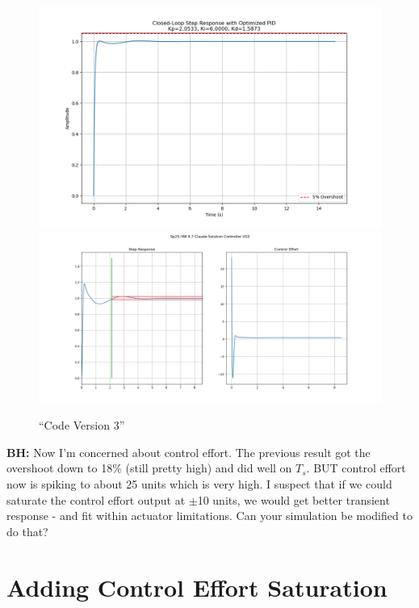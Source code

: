 \documentclass{article}
\begin{document}
\begin{figure}\centering
\includegraphics[height=0.35\textwidth]{figsapdx/M47G18cl.png}
\includegraphics[height=0.35\textwidth]{figsapdx/M47G18.png}
\caption{``Code Version 3''}
\end{figure}

\textbf{BH:}
Now I'm concerned about control effort. The previous result got the overshoot down to 18\% (still pretty high) and did well on $T_s$. BUT control effort now is spiking to about 25 units which is very high. I suspect that if we could saturate the control effort output at $\pm$10 units, we would get better transient response - and fit within actuator limitations. Can your simulation be modified to do that?


\section*{Adding Control Effort Saturation}
\end{document}
